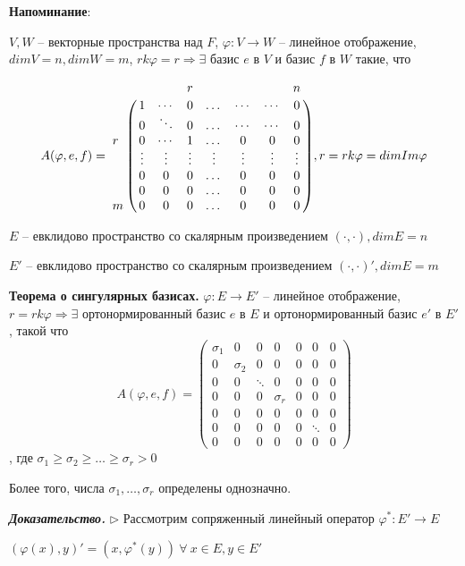 \textbf{Напоминание}:

$V, W$ -- векторные пространства над $F$, $\varphi: V \rightarrow W$ -- линейное отображение, $dim V = n, dim W = m$, $rk \varphi = r \Rightarrow \exists$ базис $e$ в $V$ и базис $f$ в $W$ такие, что 

\begin{equation*} A(\varphi, e, f) = \bordermatrix{ 
    	 & & & r & & & & n \cr
    	 & 1 & \cdots & 0 & \dots & \cdots & \cdots & 0 \cr 
         & 0 & \ddots & 0 & \dots & \cdots & \cdots & 0 \cr
		r & 0 & \cdots & 1 & \dots & 0 & 0 & 0  \cr
         & \vdots & \vdots & \vdots & \vdots & \vdots & \vdots & \vdots \cr
        & 0 & 0 & 0 & \dots & 0 & 0 & 0  \cr
        & 0 & 0 & 0 & \dots & 0 & 0 & 0  \cr
       m & 0 & 0 & 0 & \dots  & 0 & 0 & 0 }, r = rk \varphi = dim Im \varphi
\end{equation*}

\bigskip
$E$ -- евклидово пространство со скалярным произведением $(\cdot, \cdot), dimE = n$

$E'$ -- евклидово пространство со скалярным произведением $(\cdot, \cdot)', dimE = m$

\bigskip
\textbf{Теорема о сингулярных базисах.} $\varphi: E \rightarrow E'$ -- линейное отображение, $r = rk \varphi \Rightarrow \exists$ ортонормированный базис $e$ в $E$ и ортонормированный базис $e'$ в $E'$, такой что \begin{equation*}A(\varphi, e, f) = \begin{pmatrix} \sigma_1 & 0 & 0 & 0 & 0 & 0 & 0 \\  0 & \sigma_2 & 0 & 0 & 0 & 0 & 0 \\ 0 & 0 & \ddots & 0 & 0 & 0 & 0 \\ 0 & 0 & 0 & \sigma_r & 0 & 0 & 0 \\ 0 & 0 & 0 & 0 & 0 & 0 & 0 \\ 0 & 0 & 0 & 0 & 0 & \ddots & 0 \\ 0 & 0 & 0 & 0 & 0 & 0 & 0  \end{pmatrix}\end{equation*}, где $\sigma_1 \geqslant \sigma_2 \geqslant \dots \geqslant \sigma_r > 0$

Более того, числа $\sigma_1, \dots, \sigma_r$ определены однозначно.

\bigskip
\textbf{\textit{Доказательство.}} $\rhd$ Рассмотрим сопряженный линейный оператор $\varphi^*: E' \rightarrow E$

$(\varphi(x), y)' = (x, \varphi^*(y)) \ \forall \ x \in E, y \in E'$

